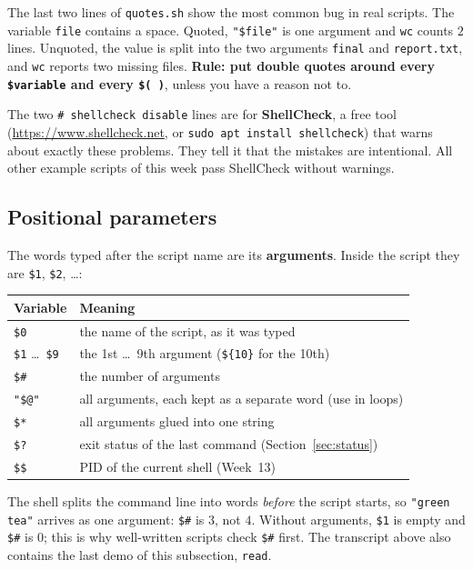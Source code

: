 \documentclass[11pt,a4paper]{article}
\newcommand{\term}[1]{\textbf{\color{mintdeep}#1}}
\newcommand{\cmd}[1]{\texttt{#1}}
\begin{document}
The last two lines of \texttt{quotes.sh} show the most common bug in real scripts. The variable \texttt{file} contains a space. Quoted, \texttt{"\$file"} is one argument and \cmd{wc} counts $2$ lines. Unquoted, the value is split into the two arguments \texttt{final} and \texttt{report.txt}, and \cmd{wc} reports two missing files. \textbf{Rule: put double quotes around every \texttt{\$variable} and every \texttt{\$( )}}, unless you have a reason not to.

The two \texttt{\# shellcheck disable} lines are for \term{ShellCheck}, a free tool (\url{https://www.shellcheck.net}, or \cmd{sudo apt install shellcheck}) that warns about exactly these problems. They tell it that the mistakes are intentional. All other example scripts of this week pass ShellCheck without warnings.

\subsection{Positional parameters}

The words typed after the script name are its \term{arguments}. Inside the script they are \texttt{\$1}, \texttt{\$2}, \ldots:




\begin{center}
\small
\begin{tabular}{@{}ll@{}}
\toprule
\textbf{Variable} & \textbf{Meaning}\\
\midrule
\texttt{\$0} & the name of the script, as it was typed\\
\texttt{\$1} \ldots\ \texttt{\$9} & the 1st \ldots\ 9th argument (\texttt{\$\{10\}} for the 10th)\\
\texttt{\$\#} & the number of arguments\\
\texttt{"\$@"} & all arguments, each kept as a separate word (use in loops)\\
\texttt{\$*} & all arguments glued into one string\\
\texttt{\$?} & exit status of the last command (Section~\ref{sec:status})\\
\texttt{\$\$} & PID of the current shell (Week~13)\\
\bottomrule
\end{tabular}
\end{center}

The shell splits the command line into words \emph{before} the script starts, so \texttt{"green tea"} arrives as one argument: \texttt{\$\#} is $3$, not $4$. Without arguments, \texttt{\$1} is empty and \texttt{\$\#} is $0$; this is why well-written scripts check \texttt{\$\#} first. The transcript above also contains the last demo of this subsection, \texttt{read}.
\end{document}
